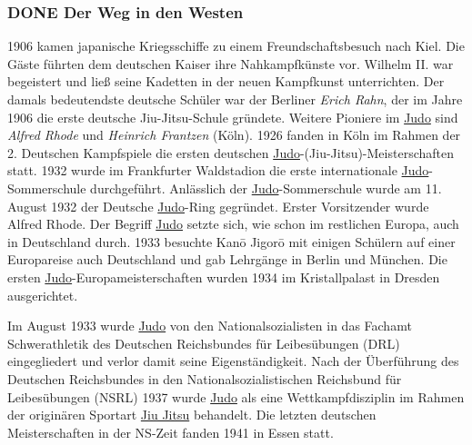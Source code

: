 \documentclass[11pt]{article}
\begin{document}
\subsubsection{{\bfseries\sffamily DONE} Der Weg in den Westen}
\label{sec:orgb6b9010}
1906 kamen japanische Kriegsschiffe zu einem Freundschaftsbesuch nach Kiel. Die Gäste führten dem deutschen Kaiser ihre Nahkampfkünste vor. Wilhelm II. war begeistert und ließ seine Kadetten in der neuen Kampfkunst unterrichten. Der damals bedeutendste deutsche Schüler war der Berliner \emph{Erich Rahn}, der im Jahre 1906 die erste deutsche Jiu-Jitsu-Schule gründete. Weitere Pioniere im \hyperref[org5f8b831]{Judo} sind \emph{Alfred Rhode} und \emph{Heinrich Frantzen} (Köln). 1926 fanden in Köln im Rahmen der 2. Deutschen Kampfspiele die ersten deutschen \hyperref[org5f8b831]{Judo}-(Jiu-Jitsu)-Meisterschaften statt. 1932 wurde im Frankfurter Waldstadion die erste internationale \hyperref[org5f8b831]{Judo}-Sommerschule durchgeführt. Anlässlich der \hyperref[org5f8b831]{Judo}-Sommerschule wurde am 11. August 1932 der Deutsche \hyperref[org5f8b831]{Judo}-Ring gegründet. Erster Vorsitzender wurde Alfred Rhode. Der Begriff \hyperref[org5f8b831]{Judo} setzte sich, wie schon im restlichen Europa, auch in Deutschland durch. 1933 besuchte Kanō Jigorō mit einigen Schülern auf einer Europareise auch Deutschland und gab Lehrgänge in Berlin und München. Die ersten \hyperref[org5f8b831]{Judo}-Europameisterschaften wurden 1934 im Kristallpalast in Dresden ausgerichtet.

Im August 1933 wurde \hyperref[org5f8b831]{Judo} von den Nationalsozialisten in das Fachamt Schwerathletik des Deutschen Reichsbundes für Leibesübungen (DRL) eingegliedert und verlor damit seine Eigenständigkeit. Nach der Überführung des Deutschen Reichsbundes in den Nationalsozialistischen Reichsbund für Leibesübungen (NSRL) 1937 wurde \hyperref[org5f8b831]{Judo} als eine Wettkampfdisziplin im Rahmen der originären Sportart \hyperref[org8a57ef0]{Jiu Jitsu} behandelt. Die letzten deutschen Meisterschaften in der NS-Zeit fanden 1941 in Essen statt.
\end{document}
